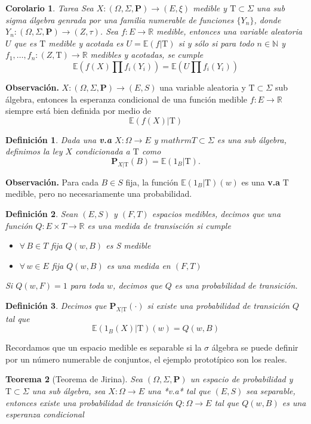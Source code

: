 \documentclass[letterpaper]{article}
\newtheorem{teorema}{Teorema}[section]
\newtheorem{cor}[teorema]{Corolario}
\newtheorem{def.}{Definici\'on}[section]
\newcommand{\nat}{\ensuremath{ \mathbb N }}
\newcommand{\prob}{\textbf{P}}
\newcommand{\esp}{\mathbb E}
\newcommand{\obs}{{\newline \noindent \sc \textbf{Observación. }}}
\newcommand{\om}{\ensuremath{\Omega}}
\newcommand{\sig}{\ensuremath{\Sigma}}
\newcommand{\re}{\ensuremath{\mathbb R }}
\begin{document}
 \begin{cor}{Tarea}
Sea $X:(\Omega,\Sigma,\prob)\rightarrow(E,\xi)$ medible y $\mathrm{T}\subset\Sigma$ una sub sigma álgebra genrada por una familia numerable de funciones $\{Y_n\}$, donde $Y_n:(\Omega,\Sigma,\prob)\rightarrow(Z,\tau)$. Sea $f:E\rightarrow\re$ medible, entonces una variable aleatoria $U$ que es $\mathrm{T}$ medible y acotada es $U=\esp(f|\mathrm{T})$ si y sólo si para todo $n\in\nat$ y $f_1,\dots,f_n:(Z,\mathrm{T})\rightarrow\re$ medibles y acotadas, se cumple
\[
\esp(f(X)\prod f_i(Y_i))=\esp(U\prod f_i(Y_i))
\]
 \end{cor}
\obs \(X:(\om,\sig,\prob)\rightarrow(E,S)\) una variable aleatoria y \(\mathrm{T}\subset\sig\) sub álgebra, entonces la esperanza condicional de una función medible \(f:E\rightarrow\re\) siempre está bien definida por medio de
\[
\esp(f(X)|\mathrm{T})
\]
\begin{def.}
 Dada una \textbf{v.a} \(X:\Omega\rightarrow E\) y \(mathrm{T}\subset\sig\) es una sub álgebra, definimos la ley \(X\) condicionada a \(\mathrm{T}\) como
 \[
 \prob_{X|\mathrm{T}}(B)=\esp(1_B|\mathrm{T}).
 \]
\end{def.}
\obs Para cada \(B\in S\) fija, la función \(\esp(1_B|\mathrm{T})(w)\) es una \textbf{v.a} \(\mathrm{T}\) medible, pero no necesariamente una probabilidad.
\begin{def.}
Sean \((E,S)\) y \((F,T)\) espacios medibles, decimos que una función \(Q:E\times T\rightarrow\re\) es una medida de transisción si cumple
\begin{itemize}
\item \(\forall\,B\in T\) fija \(Q(w,B)\) es S medible
\item \(\forall\, w\in E\) fija \(Q(w,B)\) es una medida en \((F,T)\)
\end{itemize}
Si \(Q(w,F)=1\) para toda \(w\), decimos que \(Q\) es una probabilidad de transición.
\end{def.}
\begin{def.}
Decimos que \(\prob_{X|\mathrm{T}}(\cdot)\) si existe una probabilidad de transición \(Q\) tal que
\[
    \esp(1_B(X)|\mathrm{T})(w)=Q(w,B)
\]
\end{def.}
Recordamos que un espacio medible es separable si la \(\sigma\) álgebra se puede definir por un número numerable de conjuntos, el ejemplo prototípico son los reales.
\begin{teorema}[Teorema de Jirina]
Sea $(\om,\sig,\prob)$ un espacio de probabilidad y $\mathrm{T}\subset\sig$ una sub álgebra, sea $X:\om\rightarrow E$ una *v.a* tal que $(E,S)$ sea separable, entonces existe una probabilidad de transición $Q:\om\rightarrow E$ tal que $Q(w,B)$ es una esperanza condicional
\end{teorema}
\end{document}
